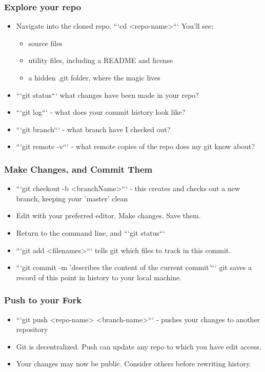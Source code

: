 \documentclass[unknownkeysallowed]{beamer}
\begin{document}
\begin{frame}
    \frametitle{Explore your repo}
    \begin{itemize}
        \item{Navigate into the cloned repo. ```cd <repo-name>``` You'll see:}
            \begin{itemize}
              \item{source files}
              \item{utility files, including a README and license}
              \item{a hidden .git folder, where the magic lives}
            \end{itemize}
        \item{```git status``` what changes have been made in your repo?}
        \item{```git log``` - what does your commit history look like?}
        \item{```git branch``` - what branch have I checked out?}
        \item{```git remote -v``` - what remote copies of the repo does my git know about?}
    \end{itemize}
\end{frame}

\begin{frame}
    \frametitle{Make Changes, and Commit Them}
    \begin{itemize}
        \item{```git checkout -b <branchName>``` - this creates and checks out a new branch, keeping your 'master' clean}
        \item{Edit with your preferred editor. Make changes. Save them.}
        \item{Return to the command line, and ```git status```}
        \item{```git add <filenames>``` tells git which files to track in this commit.}
        \item{```git commit -m 'describes the content of the current commit'``` git saves a record of this point in history to your local machine.}
    \end{itemize}
\end{frame}

\begin{frame}
    \frametitle{Push to your Fork}
    \begin{itemize}
        \item{```git push <repo-name> <branch-name>``` - pushes your changes to another repository }
        \item{Git is decentralized. Push can update any repo to which you have edit access.}
        \item{Your changes may now be public. Consider others before rewriting history.}
    \end{itemize}
\end{frame}
\end{document}
